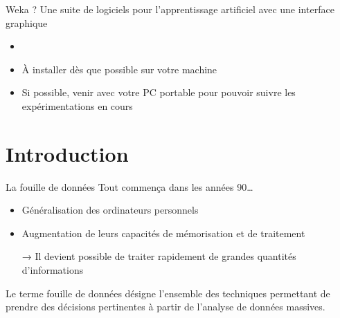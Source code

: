 \documentclass[xcolor={svgnames}, french]{beamer}
\begin{document}
\begin{frame}{Weka ?}
	Une suite de logiciels pour l'apprentissage artificiel avec une interface graphique
	\begin{itemize}
		\item {}
		\item À installer dès que possible sur votre machine
		\item Si possible, venir avec votre PC portable pour pouvoir suivre les expérimentations en cours
	\end{itemize}
\end{frame}



\section*{Introduction}

\begin{frame}{La fouille de données}
	Tout commença dans les années 90…
	\begin{itemize}
		\item Généralisation des ordinateurs personnels
		\item Augmentation de leurs capacités de mémorisation et de traitement
		\item[→] Il devient possible de traiter rapidement de grandes quantités d'informations
	\end{itemize}
	Le terme \alert{fouille de données} désigne l'ensemble des techniques permettant de prendre des décisions pertinentes à partir de l'analyse de \alert{données massives}.
\end{frame}
\end{document}
